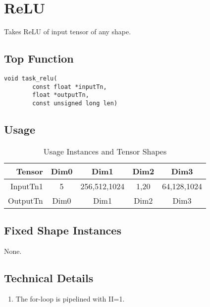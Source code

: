\pagebreak





\section{ReLU}
Takes ReLU of input tensor of any shape.

\subsection{Top Function}
\begin{lstlisting}
void task_relu(
		const float *inputTn,
		float *outputTn,
		const unsigned long len)
\end{lstlisting}

\subsection{Usage}
\begin{table}[htbp] %
\caption{Usage Instances and Tensor Shapes}
\label{tab:shapes_concat}
	\begin{center}
		\begin{tabular}{|r|c|c|c|c|} 
		\hline	
		Tensor & Dim0 & Dim1 & Dim2 & Dim3\\ 
		\hline	
		InputTn1 &
			5 &
			256,512,1024 &
			1,20 &
			64,128,1024 \\ 
		\hline
		OutputTn &
			Dim0 & 
			Dim1 & 
			Dim2 &
			Dim3	\\
		\hline
		\end{tabular}
	\end{center}
\end{table}

\subsection{Fixed Shape Instances}
None.

\subsection{Technical Details}
\begin{enumerate}
\item The for-loop is pipelined with II=1.
\end{enumerate}






\pagebreak





